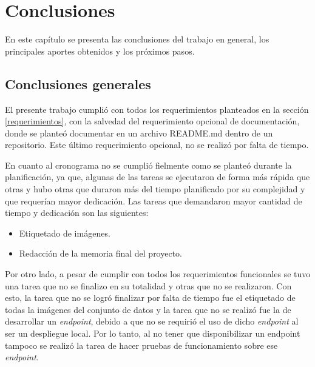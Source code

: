 
\chapter{Conclusiones} %

\label{Chapter5} %




En este capítulo se presenta las conclusiones del trabajo en general, los principales aportes obtenidos y los próximos pasos.

\section{Conclusiones generales }

El presente trabajo cumplió con todos los requerimientos planteados en la sección \ref{requerimientos}, con la salvedad del requerimiento opcional de documentación, donde se planteó documentar en un archivo README.md dentro de un repositorio. Este último requerimiento opcional, no se realizó por falta de tiempo.

En cuanto al cronograma no se cumplió fielmente como se planteó durante la planificación, ya que, algunas de las tareas se ejecutaron de forma más rápida que otras y hubo otras que duraron más del tiempo planificado por su complejidad y que requerían mayor dedicación. Las tareas que demandaron mayor cantidad de tiempo y dedicación son las siguientes:

\begin{itemize}
\item Etiquetado de imágenes.
\item Redacción de la memoria final del proyecto. 
\end{itemize}

Por otro lado, a pesar de cumplir con todos los requerimientos funcionales se tuvo una tarea que no se finalizo en su totalidad y otras que no se realizaron. Con esto, la tarea que no se logró finalizar por falta de tiempo fue el etiquetado de todas la imágenes del conjunto de datos y la tarea que no se realizó fue la de desarrollar un \textit{endpoint}, debido a que no se requirió el uso de dicho \textit{endpoint} al ser un despliegue local. Por lo tanto, al no tener que disponibilizar un endpoint tampoco se realizó la tarea de hacer pruebas de funcionamiento sobre ese \textit{endpoint}.



